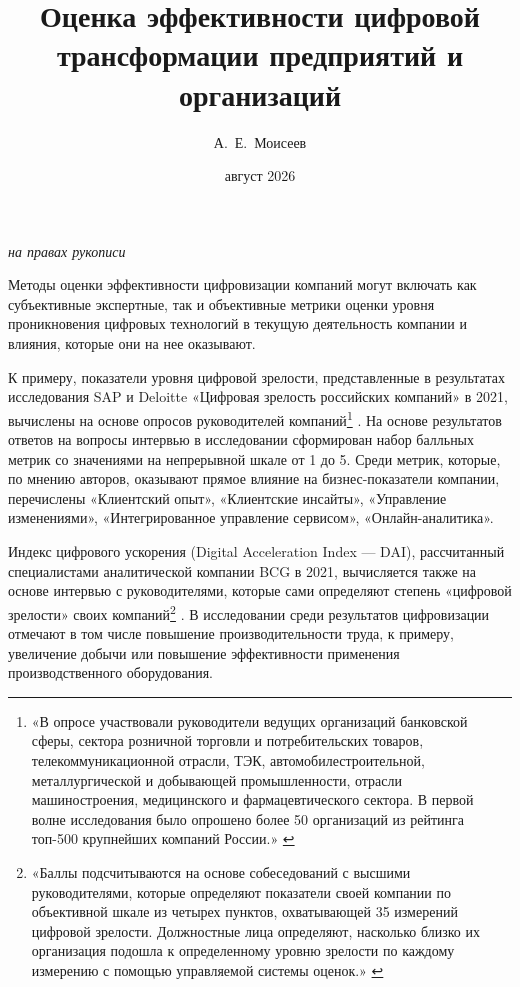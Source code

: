 \documentclass{article}
\title{Оценка эффективности цифровой трансформации предприятий и организаций}
\author{А.~Е.~Моисеев}
\date{август 2026}
\let\textitorig\textit
\renewcommand{\textit}[1]{{\fontfamily{cmr}\selectfont \textitorig{#1}}}
\begin{document}
\maketitle

\begin{center}
\textit{на правах рукописи}
\end{center}

Методы оценки эффективности цифровизации компаний могут включать как субъективные экспертные, так и объективные метрики оценки уровня проникновения цифровых технологий в текущую деятельность компании и влияния, которые они на нее оказывают.

К примеру, показатели уровня цифровой зрелости, представленные в результатах исследования SAP и Deloitte «Цифровая зрелость российских компаний» в 2021, вычислены на основе опросов руководителей компаний\footnote{«В опросе участвовали руководители ведущих организаций банковской сферы, сектора розничной торговли и потребительских товаров, телекоммуникационной отрасли, ТЭК, автомобилестроительной, металлургической и добывающей промышленности, отрасли машиностроения, медицинского и фармацевтического сектора. В первой волне исследования было опрошено более 50 организаций из рейтинга топ-500 крупнейших компаний России.» \cite{sapDeloitteSurvey_deloitte_2021}} \cite{sapDeloitteSurvey_eg_2021, sapDeloitteSurvey_deloitte_2021}. На основе результатов ответов на вопросы интервью в исследовании сформирован набор балльных метрик со значениями на непрерывной шкале от 1 до 5. Среди метрик, которые, по мнению авторов, оказывают прямое влияние на бизнес-показатели компании, перечислены «Клиентский опыт», «Клиентские инсайты», «Управление изменениями», «Интегрированное управление сервисом», «Онлайн-аналитика».

Индекс цифрового ускорения (Digital Acceleration Index — DAI), рассчитанный специалистами аналитической компании BCG в 2021, вычисляется также на основе интервью с руководителями, которые сами определяют степень «цифровой зрелости» своих компаний\footnote{«Баллы подсчитываются на основе собеседований с высшими руководителями, которые определяют показатели своей компании по объективной шкале из четырех пунктов, охватывающей 35 измерений цифровой зрелости. Должностные лица определяют, насколько близко их организация подошла к определенному уровню зрелости по каждому измерению с помощью управляемой системы оценок.» \cite{bcgSurvey2021}} \cite{bcgSurvey2021}. В исследовании среди результатов цифровизации отмечают в том числе повышение производительности труда, к примеру, увеличение добычи или повышение эффективности применения производственного оборудования.
\end{document}
